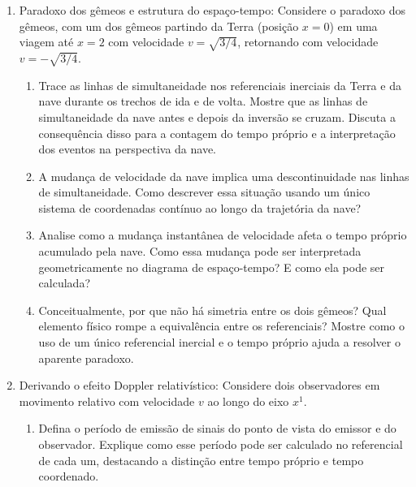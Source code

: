 \begin{enumerate}
      \item Paradoxo dos gêmeos e estrutura do espaço-tempo: Considere o paradoxo dos
            gêmeos, com um dos gêmeos partindo da Terra (posição $x = 0$) em uma viagem
            até $x = 2$ com velocidade $v = \sqrt{3/4}$, retornando com velocidade $v =
                  -\sqrt{3/4}$.

            \begin{enumerate}
                  \item Trace as linhas de simultaneidade nos referenciais inerciais da
                        Terra e da nave durante os trechos de ida e de volta. Mostre que
                        as linhas de simultaneidade da nave antes e depois da inversão
                        se cruzam. Discuta a consequência disso para a contagem do tempo
                        próprio e a interpretação dos eventos na perspectiva da nave.

                  \item A mudança de velocidade da nave implica uma descontinuidade nas
                        linhas de simultaneidade. Como descrever essa situação usando um
                        único sistema de coordenadas contínuo ao longo da trajetória da
                        nave?

                  \item Analise como a mudança instantânea de velocidade afeta o tempo
                        próprio acumulado pela nave. Como essa mudança pode ser
                        interpretada geometricamente no diagrama de espaço-tempo? E como
                        ela pode ser calculada?

                  \item Conceitualmente, por que não há simetria entre os dois gêmeos?
                        Qual elemento físico rompe a equivalência entre os referenciais?
                        Mostre como o uso de um único referencial inercial e o tempo
                        próprio ajuda a resolver o aparente paradoxo.
            \end{enumerate}

      \item Derivando o efeito Doppler relativístico: Considere dois observadores em
            movimento relativo com velocidade $v$ ao longo do eixo $x^1$.

            \begin{enumerate}
                  \item Defina o período de emissão de sinais do ponto de vista do
                        emissor e do observador. Explique como esse período pode ser calculado
                        no referencial de cada um, destacando a distinção entre tempo próprio
                        e tempo coordenado.


\end{enumerate}
\end{enumerate}
